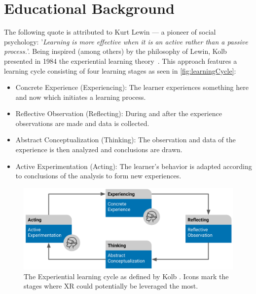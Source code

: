 %
\chapter{Educational Background}
\label{sec:concepts}

The following quote is attributed to Kurt Lewin --- a pioneer of social psychology: '\emph{Learning is more effective when it is an active rather than a passive process.}'. Being inspired (among others) by the philosophy of Lewin, Kolb presented in 1984 the experiential learning theory~\cite{kolb:1984:experiential}.
This approach features a learning cycle consisting of four learning stages as seen in \autoref{fig:learningCycle}:

\begin{itemize}
    \setlength{\itemsep}{-0.3cm}
    \item Concrete Experience (Experiencing): The learner experiences something here and now which initiates a learning process.
    \item Reflective Observation (Reflecting): During and after the experience observations are made and data is collected.
    \item Abstract Conceptualization (Thinking): The observation and data of the experience is then analyzed and conclusions are drawn.
    \item Active Experimentation (Acting): The learner's behavior is adapted according to conclusions of the analysis to form new experiences. 
\end{itemize}

\begin{figure}[h!bt]
	\centering
	\includegraphics[width=0.9\linewidth]{pictures/ExperientialLearningCycle2.png}
	\captionsetup{labelfont=bf,textfont=it}
	\caption{The Experiential learning cycle as defined by Kolb \cite{kolb:1984:experiential}. Icons mark the stages where XR could potentially be leveraged the most.\label{fig:learningCycle}}
\end{figure}

